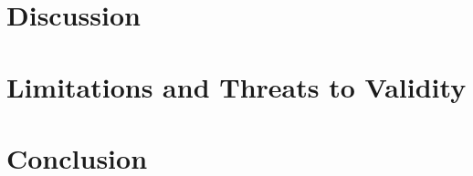 \documentclass[journal]{IEEEtran}
\begin{document}
\section{Discussion}
\label{sec:discussion}

\section{Limitations and Threats to Validity}
\label{sec:limitations}

\section{Conclusion}
\label{sec:conclusion}

\nocite{*}


\end{document}
